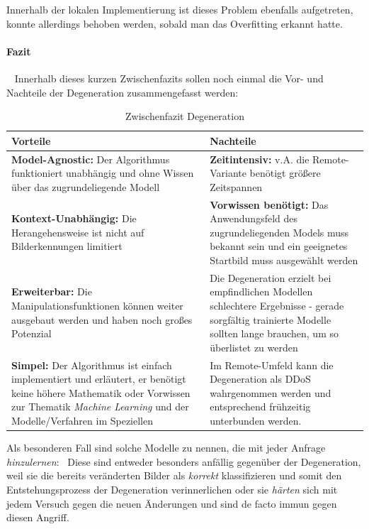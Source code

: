 Innerhalb der lokalen Implementierung ist dieses Problem ebenfalls aufgetreten, konnte allerdings behoben werden, sobald man das Overfitting erkannt hatte.
\paragraph{Fazit} ~\newline
Innerhalb dieses kurzen Zwischenfazits sollen noch einmal die Vor- und Nachteile der Degeneration zusammengefasst werden:
\begin{table}[h]
	\centering
\begin{tabular}{|p{7.5cm}|p{7.5cm}|}
	\hline 
	\textbf{Vorteile} & \textbf{Nachteile} \\ 
	\hline 
	\textbf{Model-Agnostic:} \newline Der Algorithmus funktioniert unabhängig und ohne Wissen über das zugrundeliegende Modell & \textbf{Zeitintensiv:} \newline v.A. die Remote-Variante benötigt größere Zeitspannen \\ 
	\hline 
	\textbf{Kontext-Unabhängig:} \newline Die Herangehensweise ist nicht auf Bilderkennungen limitiert & \textbf{Vorwissen benötigt:} \newline Das Anwendungsfeld des zugrundeliegenden Models muss bekannt sein und ein geeignetes Startbild muss ausgewählt werden  \\ 
	\hline 
	\textbf{Erweiterbar:} \newline Die Manipulationsfunktionen können weiter ausgebaut werden und haben noch großes Potenzial & Die Degeneration erzielt bei empfindlichen Modellen schlechtere Ergebnisse - gerade sorgfältig trainierte Modelle sollten lange brauchen, um so überlistet zu werden \\ 
	\hline 
	\textbf{Simpel:} \newline Der Algorithmus ist einfach implementiert und erläutert, er benötigt keine höhere Mathematik oder Vorwissen zur Thematik \textit{Machine Learning} und der Modelle/Verfahren im Speziellen & Im Remote-Umfeld kann die Degeneration als DDoS wahrgenommen werden und entsprechend frühzeitig unterbunden werden. \\ 
	\hline 
\end{tabular} 
\caption{Zwischenfazit Degeneration}
\label{tab:FazitDegeneration}
\end{table}

Als besonderen Fall sind solche Modelle zu nennen, die mit jeder Anfrage \textit{hinzulernen}: ~\newline Diese sind entweder besonders anfällig gegenüber der Degeneration, weil sie die bereits veränderten Bilder als \textit{korrekt} klassifizieren und somit den Entstehungsprozess der Degeneration verinnerlichen oder sie \textit{härten} sich mit jedem Versuch gegen die neuen Änderungen und sind de facto immun gegen diesen Angriff.  

